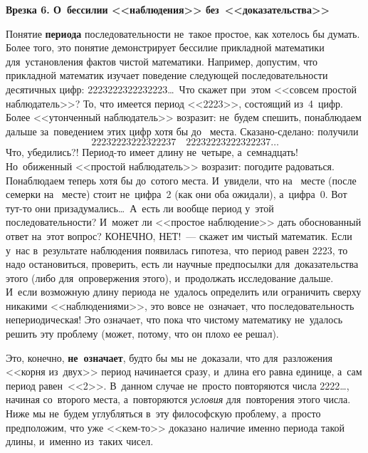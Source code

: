 \hrulefill

\smallskip

\textbf{Врезка 6. О~бессилии <<наблюдения>> без~<<доказательства>>}

Понятие \textbf{периода} последовательности не~такое простое, как хотелось бы думать. Более того, это понятие
демонстрирует бессилие прикладной математики для~установления фактов чистой математики. Например,
допустим, что прикладной математик изучает поведение следующей последовательности десятичных цифр:
2223222322232223\ldots\ Что скажет при~этом <<совсем простой наблюдатель>>? То, что имеется период
<<2223>>, состоящий из~4~цифр. Более <<утонченный наблюдатель>> возразит: не~будем спешить,
понаблюдаем дальше за~поведением этих цифр хотя бы до~ места. Сказано-сделано: получили
$$
22232223222322237\quad
22232223222322237\ldots
$$
Что, убедились?! Период-то имеет длину не~четыре,
а~семнадцать! Но~обиженный <<простой наблюдатель>> возразит: погодите радоваться. Понаблюдаем
теперь хотя бы до~сотого места. И~увидели, что на~ месте (после семерки на~ месте) стоит
не~цифра~2 (как они оба ожидали), а~цифра~0. Вот тут-то они призадумались\ldots\ А~есть ли вообще период
у~этой последовательности? И~может ли <<простое наблюдение>> дать обоснованный ответ на~этот
вопрос? КОНЕЧНО, НЕТ!~--- скажет им чистый математик. Если у~нас в~результате наблюдения появилась
гипотеза, что период равен 2223, то надо остановиться, проверить, есть ли научные предпосылки
для~доказательства этого (либо для~опровержения этого), и~продолжать исследование дальше. И~если
возможную длину периода не~удалось определить или ограничить сверху никакими <<наблюдениями>>, это
вовсе не~означает, что последовательность непериодическая! Это означает, что пока что чистому
математику не~удалось решить эту проблему (может, потому, что он плохо ее решал).

Это, конечно, \textbf{не~означает}, будто бы мы не~доказали, что для~разложения <<корня из~двух>> период
начинается сразу, и~длина его равна единице, а~сам период равен~<<2>>. В~данном случае не~просто
повторяются числа 2222\ldots, начиная со~второго места, а~повторяются \textit{условия} для~повторения этого
числа. Ниже мы не~будем углубляться в~эту философскую проблему, а~просто предположим, что уже
<<кем-то>> доказано наличие именно периода такой длины, и~именно из~таких чисел.

\smallskip

\hrulefill

\medskip


